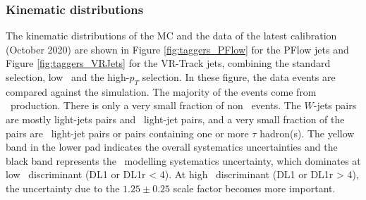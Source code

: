 \documentclass[letterpaper,12pt]{article}
\begin{document}
\subsubsection{Kinematic distributions}
The kinematic distributions of the MC and the data of the latest calibration 
(October 2020) are shown in Figure \ref{fig:taggers_PFlow} for the PFlow jets and 
Figure \ref{fig:taggers_VRJets} for the VR-Track jets, 
combining the standard selection, low \pt\ and the high-$p_T$ selection. 
In these figure, the data events are compared against the simulation.
The majority of the events come from \ttbar\ production. There is only
a very small fraction of non \ttbar\ events. The $W$-jets pairs are mostly light-jets 
pairs and \cjet\ light-jet pairs, and a very small fraction of the pairs are 
\bjet\ light-jet pairs or pairs containing one or more $\tau$ hadron(s). 
The yellow band in the lower pad indicates the overall systematics uncertainties
and the black band represents the \ttbar\ modelling systematics uncertainty, 
which dominates at low \btagging\ discriminant (DL1 or DL1r < 4). 
At high \btagging\ discriminant (DL1 or DL1r > 4), the
uncertainty due to the $1.25 \pm 0.25$ scale factor becomes more important. 
\end{document}
